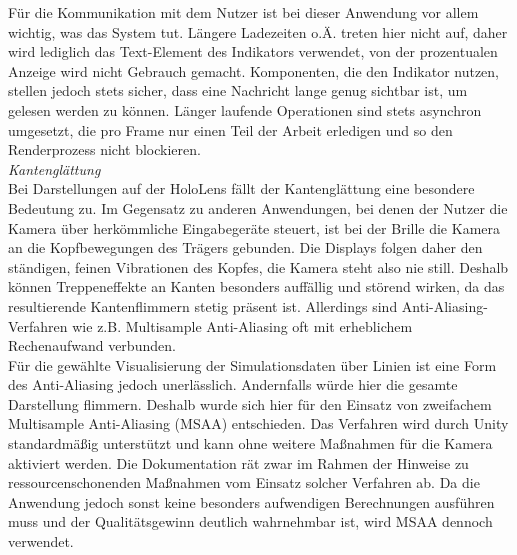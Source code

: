 Für die Kommunikation mit dem Nutzer ist bei dieser Anwendung vor allem wichtig, was das System tut. Längere Ladezeiten o.Ä. treten hier nicht auf, daher wird lediglich das Text-Element des Indikators verwendet, von der prozentualen Anzeige wird nicht Gebrauch gemacht. Komponenten, die den Indikator nutzen, stellen jedoch stets sicher, dass eine Nachricht lange genug sichtbar ist, um gelesen werden zu können. Länger laufende Operationen sind stets asynchron umgesetzt, die pro Frame nur einen Teil der Arbeit erledigen und so den Renderprozess nicht blockieren.\\

\textit{Kantenglättung}\\
Bei Darstellungen auf der HoloLens fällt der Kantenglättung eine besondere Bedeutung zu. Im Gegensatz zu anderen Anwendungen, bei denen der Nutzer die Kamera über herkömmliche Eingabegeräte steuert, ist bei der Brille die Kamera an die Kopfbewegungen des Trägers gebunden. Die Displays folgen daher den ständigen, feinen Vibrationen des Kopfes, die Kamera steht also nie still. Deshalb können Treppeneffekte an Kanten besonders auffällig und störend wirken, da das resultierende Kantenflimmern stetig präsent ist. Allerdings sind Anti-Aliasing-Verfahren wie z.B. Multisample Anti-Aliasing oft mit erheblichem Rechenaufwand verbunden.\\

Für die gewählte Visualisierung der Simulationsdaten über Linien ist eine Form des Anti-Aliasing jedoch unerlässlich. Andernfalls würde hier die gesamte Darstellung flimmern. Deshalb wurde sich hier für den Einsatz von zweifachem Multisample Anti-Aliasing (MSAA) entschieden. Das Verfahren wird durch Unity standardmäßig unterstützt und kann ohne weitere Maßnahmen für die Kamera aktiviert werden. Die Dokumentation rät zwar im Rahmen der Hinweise zu ressourcenschonenden Maßnahmen vom Einsatz solcher Verfahren ab. Da die Anwendung jedoch sonst keine besonders aufwendigen Berechnungen ausführen muss und der Qualitätsgewinn deutlich wahrnehmbar ist, wird MSAA dennoch verwendet.

